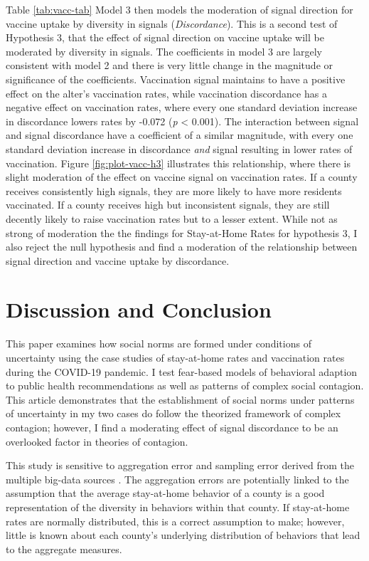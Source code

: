 Table \ref{tab:vacc-tab} Model 3 then models the moderation of signal direction
for vaccine uptake by diversity in signals (\emph{Discordance}). This is a second
test of Hypothesis 3, that the effect of signal direction on vaccine uptake will
be moderated by diversity in signals. The coefficients in model 3 are largely
consistent with model 2 and there is very little change in the magnitude
or significance of the coefficients. Vaccination signal maintains to have a positive
effect on the alter's vaccination rates, while vaccination discordance has a negative effect on vaccination rates, where every one standard deviation increase in discordance lowers rates by -0.072 (\emph{p} \textless{} 0.001). The interaction between signal and signal discordance have a coefficient of a similar magnitude, with every one standard deviation increase
in discordance \emph{and} signal resulting in 
lower rates of vaccination. Figure \ref{fig:plot-vacc-h3} illustrates this
relationship, where there is slight moderation of the effect on vaccine signal
on vaccination rates. If a county receives consistently high signals, they are
more likely to have more residents vaccinated. If a county receives high but
inconsistent signals, they are still decently likely to raise vaccination rates
but to a lesser extent. While not as strong of moderation the the findings for
Stay-at-Home Rates for hypothesis 3, I also reject the null hypothesis and find
a moderation of the relationship between signal direction and vaccine uptake by
discordance.

\hypertarget{discussion-and-conclusion}{%
\section{Discussion and Conclusion}\label{discussion-and-conclusion}}

This paper examines how social norms are formed under conditions of uncertainty
using the case studies of stay-at-home rates and vaccination rates during the
COVID-19 pandemic. I test fear-based models of behavioral adaption to public
health recommendations as well as patterns of complex social contagion. This
article demonstrates that the establishment of social norms under patterns of
uncertainty in my two cases do follow the theorized framework of complex
contagion; however, I find a moderating effect of signal discordance to be an
overlooked factor in theories of contagion.

This study is sensitive to aggregation error and sampling error derived from the
multiple big-data sources \citep{facebook20, google2020}. The aggregation errors are
potentially linked to the assumption that the average stay-at-home behavior of a
county is a good representation of the diversity in behaviors within that
county. If stay-at-home rates are normally distributed, this is a correct
assumption to make; however, little is known about each county's underlying
distribution of behaviors that lead to the aggregate measures.

